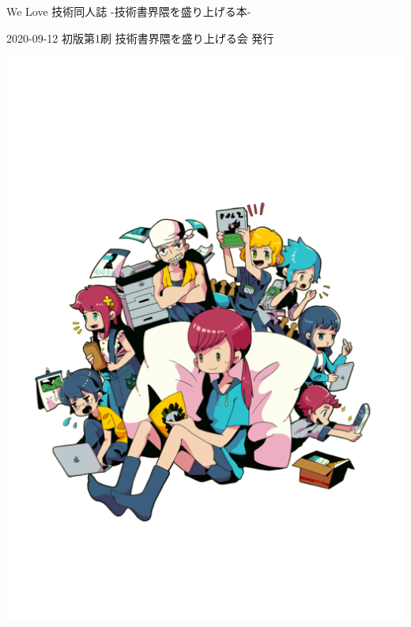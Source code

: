 \clearpage{\thispagestyle{empty}}
\begin{center}

\vspace{120pt}

\begin{sffamily}
\Large
We Love 技術同人誌 -技術書界隈を盛り上げる本-
\normalsize
\end{sffamily}
\vspace{320pt}

\begin{sffamily}
2020-09-12
\hspace{5pt}
初版第1刷
\hspace{5pt}
技術書界隈を盛り上げる会
\hspace{5pt}
発行
\end{sffamily}

\includegraphics[width=0.3\linewidth]{images/kaiwai.png}

\end{center}
